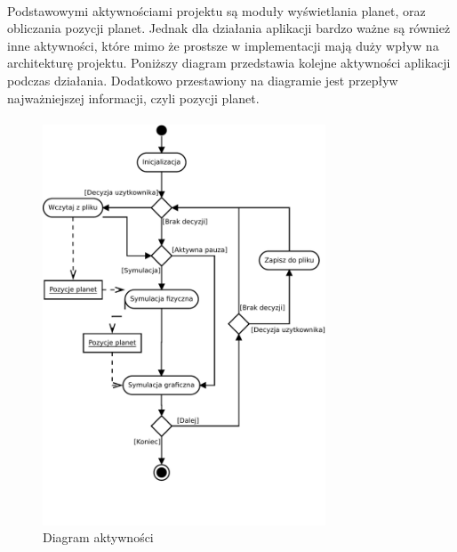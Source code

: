 \paragraph{}

Podstawowymi aktywnościami projektu są moduły wyświetlania planet, oraz obliczania pozycji planet. Jednak dla działania aplikacji bardzo ważne są również inne aktywności, które mimo że prostsze w implementacji mają duży wpływ na architekturę projektu. Poniższy diagram przedstawia kolejne aktywności aplikacji podczas działania. Dodatkowo przestawiony na diagramie jest przepływ najważniejszej informacji, czyli pozycji planet.

\paragraph{}

\begin{figure}[ht!]
	\centering
	\includegraphics[width=0.75\textwidth]{activity.pdf}
	\caption{Diagram aktywności}
	\label{fig:activity}
\end{figure}


